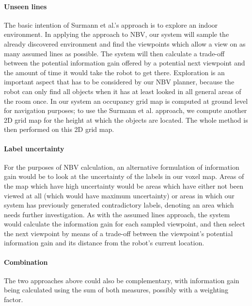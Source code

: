 \documentclass[a4paper,11pt,english]{article}
\begin{document}
\paragraph{Unseen lines}
The basic intention of Surmann et al.'s approach is to explore an indoor environment.
In applying the approach to NBV, our system will sample the already discovered environment and find the viewpoints which allow a view on as many assumed lines as possible.
The system will then calculate a trade-off between the potential information gain offered by a potential next viewpoint and the amount of time it would take the robot to get there.
Exploration is an important aspect that has to be considered by our NBV planner, because the robot can only find all objects when it has at least looked in all general areas of the room once.
In our system an occupancy grid map is computed at ground level for navigation purposes; to use the Surmann et al. approach, we compute another 2D grid map for the height at which the objects are located.
The whole method is then performed on this 2D grid map.

\paragraph{Label uncertainty}
For the purposes of NBV calculation, an alternative formulation of information gain would be to look at the uncertainty of the labels in our voxel map.
Areas of the map which have high uncertainty would be areas which have either not been viewed at all (which would have maximum uncertainty) or areas in which our system has previously generated contradictory labels, denoting an area which needs further investigation.
As with the assumed lines approach, the system would calculate the information gain for each sampled viewpoint, and then select the next viewpoint by means of a trade-off between the viewpoint's potential information gain and its distance from the robot's current location.

\paragraph{Combination}
The two approaches above could also be complementary, with information gain being calculated using the sum of both measures, possibly with a weighting factor.

\end{document}
